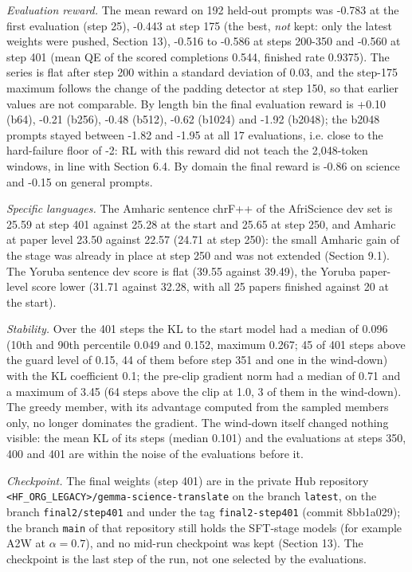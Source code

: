 \emph{Evaluation reward.} The mean reward on 192 held-out prompts was -0.783 at the first evaluation (step 25), -0.443 at step 175 (the best, \emph{not} kept: only the latest weights were pushed, Section 13), -0.516 to -0.586 at steps 200-350 and -0.560 at step 401 (mean QE of the scored completions 0.544, finished rate 0.9375). The series is flat after step 200 within a standard deviation of 0.03, and the step-175 maximum follows the change of the padding detector at step 150, so that earlier values are not comparable. By length bin the final evaluation reward is +0.10 (b64), -0.21 (b256), -0.48 (b512), -0.62 (b1024) and -1.92 (b2048); the b2048 prompts stayed between -1.82 and -1.95 at all 17 evaluations, i.e. close to the hard-failure floor of -2: RL with this reward did not teach the 2,048-token windows, in line with Section 6.4. By domain the final reward is -0.86 on science and -0.15 on general prompts.

\emph{Specific languages.} The Amharic sentence chrF++ of the AfriScience dev set is 25.59 at step 401 against 25.28 at the start and 25.65 at step 250, and Amharic at paper level 23.50 against 22.57 (24.71 at step 250): the small Amharic gain of the stage was already in place at step 250 and was not extended (Section 9.1). The Yoruba sentence dev score is flat (39.55 against 39.49), the Yoruba paper-level score lower (31.71 against 32.28, with all 25 papers finished against 20 at the start).

\emph{Stability.} Over the 401 steps the KL to the start model had a median of 0.096 (10th and 90th percentile 0.049 and 0.152, maximum 0.267; 45 of 401 steps above the guard level of 0.15, 44 of them before step 351 and one in the wind-down) with the KL coefficient 0.1; the pre-clip gradient norm had a median of 0.71 and a maximum of 3.45 (64 steps above the clip at 1.0, 3 of them in the wind-down). The greedy member, with its advantage computed from the sampled members only, no longer dominates the gradient. The wind-down itself changed nothing visible: the mean KL of its steps (median 0.101) and the evaluations at steps 350, 400 and 401 are within the noise of the evaluations before it.

\emph{Checkpoint.} The final weights (step 401) are in the private Hub repository \texttt{<HF_ORG_LEGACY>/gemma-science-translate} on the branch \texttt{latest}, on the branch \texttt{final2/step401} and under the tag \texttt{final2-step401} (commit 8bb1a029); the branch \texttt{main} of that repository still holds the SFT-stage models (for example A2W at \(\alpha=0.7\)), and no mid-run checkpoint was kept (Section 13). The checkpoint is the last step of the run, not one selected by the evaluations.

